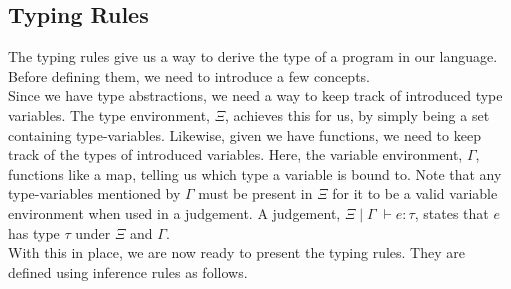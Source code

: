 \documentclass[a4paper, 11pt]{report}
\theoremstyle{definition}
\newcommand{\var}{x}
\newcommand{\expr}{e}
\newcommand{\TT}{()}
\newcommand{\Num}[1]{\overline{#1}}
\newcommand{\Tunit}{\mathsf{Unit}}
\newcommand{\Tint}{\mathbb{Z}}
\newcommand{\Tbool}{\mathbb{B}}
\newcommand{\typ}{\tau}
\newcommand{\venv}{\Gamma}
\newcommand{\tenv}{\Xi}
\newcommand{\jdg}[4]{#1 \; | \; #2 \; \vdash #3 : #4}
\begin{document}
\subsection{Typing Rules}
The typing rules give us a way to derive the type of a program in our language. Before defining them, we need to introduce a few concepts.\\
Since we have type abstractions, we need a way to keep track of introduced type variables. The type environment, $\tenv$, achieves this for us, by simply being a set containing type-variables. Likewise, given we have functions, we need to keep track of the types of introduced variables. Here, the variable environment, $\venv$, functions like a map, telling us which type a variable is bound to. Note that any type-variables mentioned by $\venv$ must be present in  $\tenv$ for it to be a valid variable environment when used in a judgement. A judgement, $\jdg{\tenv}{\venv}{\expr}{\typ}$, states that $\expr$ has type $\typ$ under $\tenv$ and $\venv$.\\
With this in place, we are now ready to present the typing rules. They are defined using inference rules as follows.
\end{document}
